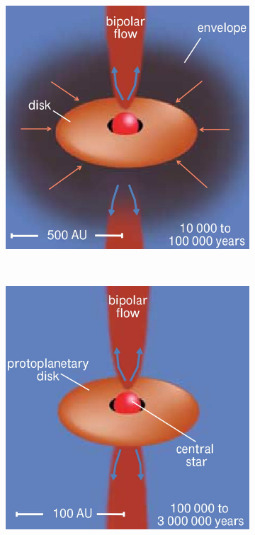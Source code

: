 \begin{figure}[h]
\begin{subfigure}[c]{0.3\textwidth}
		\label{fig:star-formation:2}
	\end{subfigure}\hfill%
	\begin{subfigure}[c]{0.3\textwidth}
		\includegraphics[width=\textwidth]{img/sf3-1}
		\label{fig:star-formation:3}
	\end{subfigure}%
	\\
		\begin{subfigure}[c]{0.3\textwidth}
		\includegraphics[width=\textwidth]{img/sf4-1}

\end{subfigure}
\end{figure}
